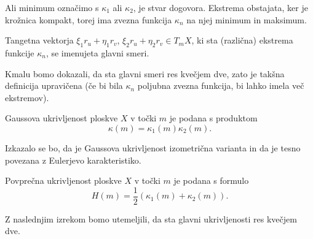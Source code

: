 \begin{opomba}
 Ali minimum označimo s $\kappa_1$ ali $\kappa_2$, je stvar dogovora. Ekstrema obstajata, ker je krožnica kompakt, torej ima zvezna funkcija $\kappa_n$ na njej minimum in maksimum.
\end{opomba}

\begin{definicija}
\label{def_glavni_smeri}
 Tangetna vektorja $\xi_1 r_u  + \eta_1 r_v$, $\xi_2 r_u  + \eta_2 r_v \in T_mX$, ki sta (različna) ekstrema funkcije $\kappa_n$, se imenujeta glavni smeri.
\end{definicija}

\begin{opomba}
 Kmalu bomo dokazali, da sta glavni smeri res kvečjem dve, zato je takšna definicija upravičena (če bi bila $\kappa_n$ poljubna zvezna funkcija, bi lahko imela več ekstremov).
\end{opomba}

\begin{definicija}
\label{def_Gaussova_ukrivljenost}
 Gaussova ukrivljenost ploskve $X$ v točki $m$ je podana s produktom 
 \begin{equation*} \kappa(m) = \kappa_1(m) \kappa_2(m).\end{equation*}
\end{definicija}

\begin{opomba}
 Izkazalo se bo, da je Gaussova ukrivljenost izometrična varianta in da je tesno povezana z Eulerjevo karakteristiko.
\end{opomba}


\begin{definicija}
\label{def_povprecna_ukrivljenost}
    Povprečna ukrivljenost ploskve $X$ v točki $m$ je podana s formulo 
    \begin{equation*} H(m) = \frac{1}{2} (\kappa_1(m) + \kappa_2(m) ).\end{equation*}
\end{definicija}

Z naslednjim izrekom bomo utemeljili, da sta glavni ukrivljenosti res kvečjem dve. 

